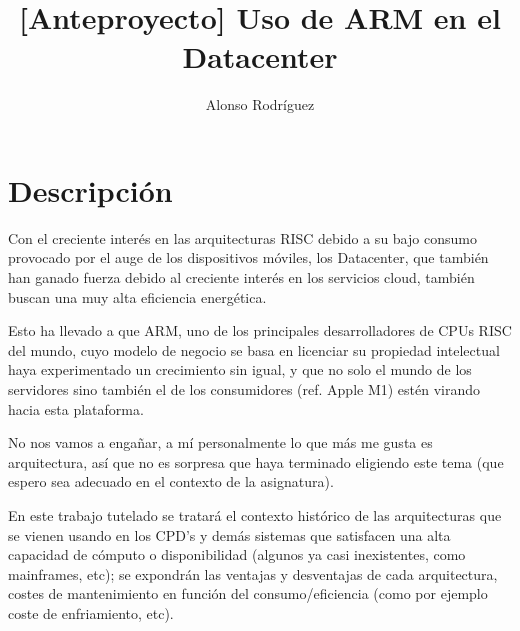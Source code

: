 \documentclass[a4paper,openright,12pt]{article}
\begin{document}
\author {Alonso Rodríguez}
\title {[Anteproyecto] Uso de ARM en el Datacenter}

\maketitle

\justifying{}


\section{Descripción}
Con el creciente interés en las arquitecturas RISC debido a su bajo consumo provocado por el auge de los dispositivos móviles,
los Datacenter, que también han ganado fuerza debido al creciente interés en los servicios cloud, también buscan una muy alta eficiencia
energética.

Esto ha llevado a que ARM, uno de los principales desarrolladores de CPUs RISC del mundo, cuyo modelo de negocio se basa en licenciar su propiedad intelectual
haya experimentado un crecimiento sin igual, y que no solo el mundo de los servidores sino también el de los consumidores (ref. Apple M1) estén virando hacia
esta plataforma.

No nos vamos a engañar, a mí personalmente lo que más me gusta es arquitectura, así que no es sorpresa que haya terminado eligiendo este tema (que espero sea adecuado
en el contexto de la asignatura).

En este trabajo tutelado se tratará el contexto histórico de las arquitecturas que se vienen usando en los CPD's y demás sistemas que satisfacen una alta capacidad de cómputo
o disponibilidad (algunos ya casi inexistentes, como mainframes, etc); se expondrán las ventajas y desventajas de cada arquitectura, costes de mantenimiento en función del
consumo/eficiencia (como por ejemplo coste de enfriamiento, etc).


\clearpage
\end{document}
